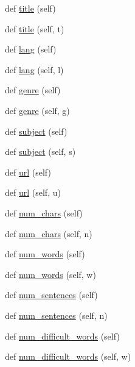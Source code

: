 \begin{DoxyCompactItemize}
def \hyperlink{classbridges_1_1data__src__dependent_1_1book_1_1_book_a62542e66172147fef8100c6acb410934}{title} (self)
\item 
def \hyperlink{classbridges_1_1data__src__dependent_1_1book_1_1_book_a73c839727f5cf9c0a47ca70d84b322b4}{title} (self, t)
\item 
def \hyperlink{classbridges_1_1data__src__dependent_1_1book_1_1_book_ab5c45b128634ba8f6c4e001a0c2dba59}{lang} (self)
\item 
def \hyperlink{classbridges_1_1data__src__dependent_1_1book_1_1_book_a7beb2b850b8278afc1f8bbd97adc9003}{lang} (self, l)
\item 
def \hyperlink{classbridges_1_1data__src__dependent_1_1book_1_1_book_ad1be24582b2d609dba9aab8723c11e62}{genre} (self)
\item 
def \hyperlink{classbridges_1_1data__src__dependent_1_1book_1_1_book_ad841929b6f2bda9300e0c10a4505be67}{genre} (self, g)
\item 
def \hyperlink{classbridges_1_1data__src__dependent_1_1book_1_1_book_a7d341f7c11e9debad855369b16ca705b}{subject} (self)
\item 
def \hyperlink{classbridges_1_1data__src__dependent_1_1book_1_1_book_a98d8cadf6f5edcad1b08daf63c3d4323}{subject} (self, s)
\item 
def \hyperlink{classbridges_1_1data__src__dependent_1_1book_1_1_book_a22ff8b74af33e50a04d7f017b7cd8012}{url} (self)
\item 
def \hyperlink{classbridges_1_1data__src__dependent_1_1book_1_1_book_a193b108cb73c94087a907e61481618e2}{url} (self, u)
\item 
def \hyperlink{classbridges_1_1data__src__dependent_1_1book_1_1_book_abff11391cd2e9d5e91079cf6ededaf80}{num\+\_\+chars} (self)
\item 
def \hyperlink{classbridges_1_1data__src__dependent_1_1book_1_1_book_a025cb07dd0ced8fc21b6d09520b8a53e}{num\+\_\+chars} (self, n)
\item 
def \hyperlink{classbridges_1_1data__src__dependent_1_1book_1_1_book_ac86f9a50d525d837ff89a37065ab0658}{num\+\_\+words} (self)
\item 
def \hyperlink{classbridges_1_1data__src__dependent_1_1book_1_1_book_a4a85170fae3a76808296ff26ff6d98e7}{num\+\_\+words} (self, w)
\item 
def \hyperlink{classbridges_1_1data__src__dependent_1_1book_1_1_book_a930177100f51eeaee0483fc7356cdc9d}{num\+\_\+sentences} (self)
\item 
def \hyperlink{classbridges_1_1data__src__dependent_1_1book_1_1_book_ab346d0ac4ebeada22a4a4960a6fceffd}{num\+\_\+sentences} (self, n)
\item 
def \hyperlink{classbridges_1_1data__src__dependent_1_1book_1_1_book_a4f4cee10b4c7d5178f85ecdcc9851247}{num\+\_\+difficult\+\_\+words} (self)
\item 
def \hyperlink{classbridges_1_1data__src__dependent_1_1book_1_1_book_a20dcb73b736ff00a76e06e7455ec9623}{num\+\_\+difficult\+\_\+words} (self, w)
\end{DoxyCompactItemize}


